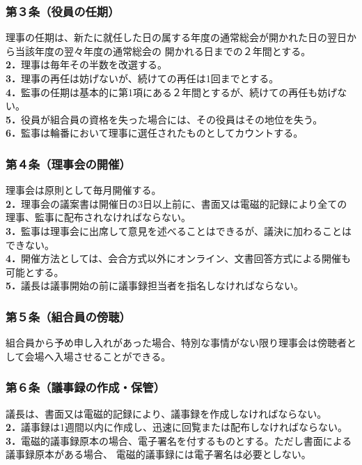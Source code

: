 \documentclass[12pt,uplatex]{jsarticle}
\begin{document}
\subsubsection*{ 第３条（役員の任期）}
理事の任期は、新たに就任した日の属する年度の通常総会が開かれた日の翌日から当該年度の翌々年度の通常総会の
開かれる日までの２年間とする。\\
\textbf{2．}理事は毎年その半数を改選する。\\
\textbf{3．}理事の再任は妨げないが、続けての再任は1回までとする。\\
\textbf{4．}監事の任期は基本的に第1項にある２年間とするが、続けての再任も妨げない。\\
\textbf{5．}役員が組合員の資格を失った場合には、その役員はその地位を失う。\\
\textbf{6．}監事は輪番において理事に選任されたものとしてカウントする。\\
\subsubsection*{ 第４条（理事会の開催）}
理事会は原則として毎月開催する。\\
\textbf{2．}理事会の議案書は開催日の3日以上前に、書面又は電磁的記録により全ての理事、監事に配布されなければならない。\\
\textbf{3．}監事は理事会に出席して意見を述べることはできるが、議決に加わることはできない。\\
\textbf{4．}開催方法としては、会合方式以外にオンライン、文書回答方式による開催も可能とする。\\
\textbf{5．}議長は議事開始の前に議事録担当者を指名しなければならない。\\
\subsubsection*{ 第５条（組合員の傍聴）}
組合員から予め申し入れがあった場合、特別な事情がない限り理事会は傍聴者として会場へ入場させることができる。
\subsubsection*{ 第６条（議事録の作成・保管）}
議長は、書面又は電磁的記録により、議事録を作成しなければならない。\\
\textbf{2．}議事録は1週間以内に作成し、迅速に回覧または配布しなければならない。\\
\textbf{3．}電磁的議事録原本の場合、電子署名を付するものとする。ただし書面による議事録原本がある場合、
電磁的議事録には電子署名は必要としない。\\
\end{document}
